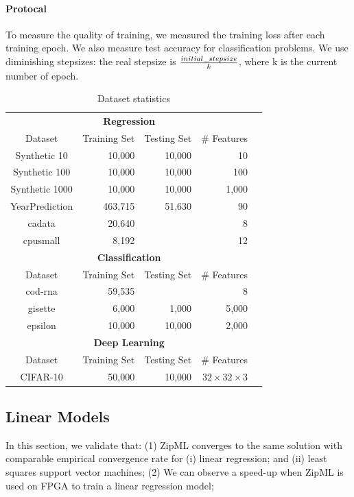 \documentclass{article}
\begin{document}
\paragraph{Protocal} To measure the quality of training,
we measured the training loss after each training epoch. We also measure test accuracy for classification problems. We use diminishing stepsizes: the real stepsize is ${initial\_stepsize\over k}$, where k is the current number of epoch.

\begin{table}[t]
\scriptsize
\centering
\begin{tabular}{crrrr}
\hline
\multicolumn{4}{c}{\bf Regression}\\
Dataset           & Training Set & Testing Set & \# Features  \\
\hline
Synthetic 10   & 10,000        & 10,000       & 10               \\
Synthetic 100  & 10,000        & 10,000       & 100              \\
Synthetic 1000 & 10,000        & 10,000       & 1,000           \\
YearPrediction & 463,715       & 51,630       & 90                  \\
cadata         & 20,640        &              & 8                   \\
cpusmall       & 8,192         &              & 12     \\
\hline
\hline
\multicolumn{4}{c}{\bf Classification}\\
Dataset           & Training Set & Testing Set & \# Features \\
\hline
cod-rna        & 59,535        &              & 8    \\
gisette        & 6,000         & 1,000        & 5,000  \\  
epsilon        & 10,000        & 10,000       & 2,000\\  
\hline
\hline
\multicolumn{4}{c}{\bf Deep Learning}\\
Dataset           & Training Set & Testing Set & \# Features \\
\hline
CIFAR-10        & 50,000        & 10,000             &$32\times 32\times 3$     \\
\hline
\end{tabular}
\caption{Dataset statistics}
\label{table:dataset}
\end{table}

\subsection{Linear Models}
In this section, we validate that: (1) ZipML 
converges to the same solution with comparable
empirical convergence rate for (i) linear regression;
and (ii) least squares support vector machines;
(2) We can observe a speed-up when ZipML is used on FPGA to train a linear regression model;
\end{document}
